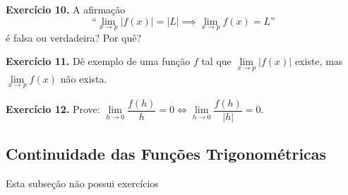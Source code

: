 \documentclass[12pt,a4paper]{article}
\begin{document}
\vspace{0.5cm}
\noindent\textbf{Exercício 10.}
A afirmação
\[
\text{``}\lim_{x \to p} |f(x)| = |L| \implies \lim_{x \to p} f(x) = L\text{''}
\]
é falsa ou verdadeira? Por quê?

\vspace{0.5cm}
\noindent\textbf{Exercício 11.}
Dê exemplo de uma função $f$ tal que $\lim\limits_{x \to p} |f(x)|$ existe, mas $\lim\limits_{x \to p} f(x)$ não exista.

\vspace{0.5cm}
\noindent\textbf{Exercício 12.}
Prove: $\lim\limits_{h \to 0} \dfrac{f(h)}{h} = 0 \iff \lim\limits_{h \to 0} \dfrac{f(h)}{|h|} = 0$.

\subsection{Continuidade das Funções Trigonométricas}
Esta subseção não possui exercícios
\end{document}
